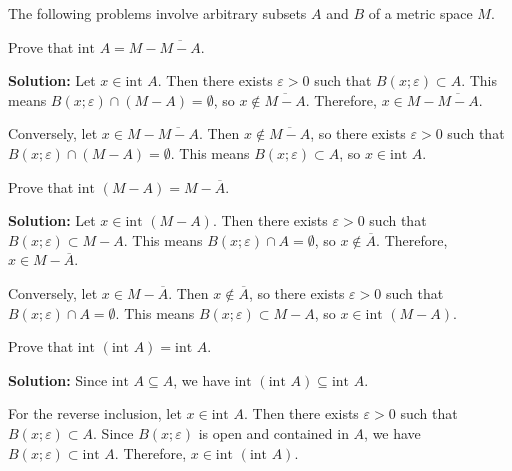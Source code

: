 \begin{problembox}
The following problems involve arbitrary subsets \( A \) and \( B \) of a metric space \( M \).
\end{problembox}

\begin{problembox}
Prove that \(\text{int } A = M - \overline{M - A}\).
\end{problembox}

\textbf{Solution:} Let $x \in \text{int } A$. Then there exists $\varepsilon > 0$ such that $B(x;\varepsilon) \subset A$. This means $B(x;\varepsilon) \cap (M - A) = \emptyset$, so $x \notin \overline{M - A}$. Therefore, $x \in M - \overline{M - A}$.

Conversely, let $x \in M - \overline{M - A}$. Then $x \notin \overline{M - A}$, so there exists $\varepsilon > 0$ such that $B(x;\varepsilon) \cap (M - A) = \emptyset$. This means $B(x;\varepsilon) \subset A$, so $x \in \text{int } A$.

\begin{problembox}
Prove that \(\text{int }(M - A) = M - \overline{A}\).
\end{problembox}

\textbf{Solution:} Let $x \in \text{int }(M - A)$. Then there exists $\varepsilon > 0$ such that $B(x;\varepsilon) \subset M - A$. This means $B(x;\varepsilon) \cap A = \emptyset$, so $x \notin \overline{A}$. Therefore, $x \in M - \overline{A}$.

Conversely, let $x \in M - \overline{A}$. Then $x \notin \overline{A}$, so there exists $\varepsilon > 0$ such that $B(x;\varepsilon) \cap A = \emptyset$. This means $B(x;\varepsilon) \subset M - A$, so $x \in \text{int }(M - A)$.

\begin{problembox}
Prove that \(\text{int }(\text{int } A) = \text{int } A\).
\end{problembox}

\textbf{Solution:} Since $\text{int } A \subseteq A$, we have $\text{int }(\text{int } A) \subseteq \text{int } A$.

For the reverse inclusion, let $x \in \text{int } A$. Then there exists $\varepsilon > 0$ such that $B(x;\varepsilon) \subset A$. Since $B(x;\varepsilon)$ is open and contained in $A$, we have $B(x;\varepsilon) \subset \text{int } A$. Therefore, $x \in \text{int }(\text{int } A)$.

